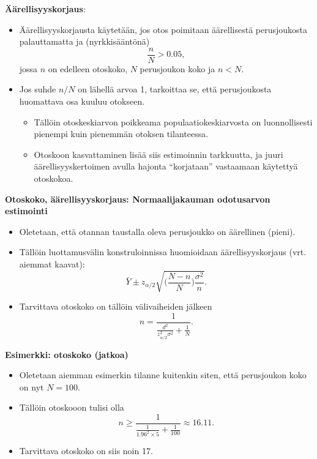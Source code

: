 \documentclass[
]{book}
\providecommand{\tightlist}{%
  \setlength{\itemsep}{0pt}\setlength{\parskip}{0pt}}
\begin{document}
\textbf{Äärellisyyskorjaus}:

\begin{itemize}
\item
  Äärellisyyskorjausta käytetään, jos otos poimitaan äärellisestä perusjoukosta palauttamatta ja (nyrkkisääntönä)
  \[
  \frac{n}{N} > 0.05,
  \]
  jossa \(n\) on edelleen otoskoko, \(N\) perusjoukon koko ja \(n < N\).
\item
  Jos suhde \(n/N\) on lähellä arvoa 1, tarkoittaa se, että perusjoukosta
  huomattava osa kuuluu otokseen.

  \begin{itemize}
  \tightlist
  \item
    Tällöin otoskeskiarvon poikkeama populaatiokeskiarvosta on luonnollisesti pienempi kuin pienemmän otoksen tilanteessa.
  \item
    Otoskoon kasvattaminen lisää siis estimoinnin tarkkuutta, ja juuri äärellisyyskertoimen avulla hajonta ``korjataan'' vastaamaan käytettyä otoskokoa.
  \end{itemize}
\end{itemize}

\textbf{Otoskoko, äärellisyyskorjaus: Normaalijakauman odotusarvon estimointi}

\begin{itemize}
\item
  Oletetaan, että otannan taustalla oleva perusjoukko on äärellinen (pieni).
\item
  Tällöin luottamusvälin konstruloinnissa huomioidaan äärellisyyskorjaus
  (vrt. aiemmat kaavat):
  \[
  \bar{Y} \pm z_{\alpha/2} \sqrt{\Big(\frac{N-n}{N}\Big)\frac{\sigma^2}{n}}.
  \]
\item
  Tarvittava otoskoko on tällöin välivaiheiden jälkeen
  \[
  n =\frac{1}{\frac{d^2}{z^2_{\alpha/2} \sigma^2} + \frac{1}{N}}.
  \]
\end{itemize}

\hfill\break

\begin{eblock}{}

\textbf{Esimerkki: otoskoko (jatkoa)}

\begin{itemize}
\item
  Oletetaan aiemman esimerkin tilanne kuitenkin siten, että perusjoukon koko on nyt \(N=100\).
\item
  Tällöin otoskooon tulisi olla
  \[
  n  \ge \frac{1}{\frac{1}{1.96^2 \times 5} + \frac{1}{100}} \approx 16.11.
  \]
\item
  Tarvittava otoskoko on siis noin 17.
\end{itemize}

\end{eblock}
\end{document}
